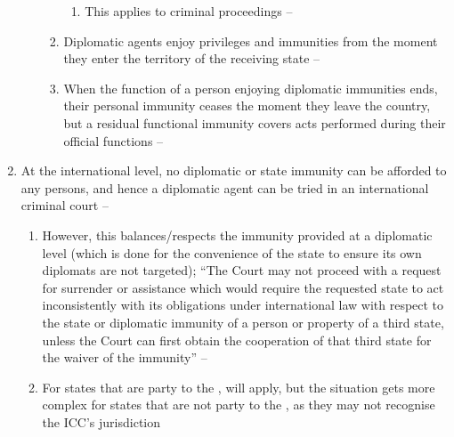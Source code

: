 \begin{enumerate}
\begin{enumerate}
\begin{enumerate}
\begin{enumerate}
                \item This applies to criminal proceedings -- 
            \end{enumerate}
            \item Diplomatic agents enjoy privileges and immunities from the moment they enter the territory of the receiving state -- 
            \item When the function of a person enjoying diplomatic immunities ends, their personal immunity ceases the moment they leave the country, but a residual functional immunity covers acts performed during their official functions -- 
        \end{enumerate}
    \end{enumerate}
    \item At the international level, no diplomatic or state immunity can be afforded to any persons, and hence a diplomatic agent can be tried in an international criminal court -- 
    \begin{enumerate}
        \item However, this balances/respects the immunity provided at a diplomatic level (which is done for the convenience of the state to ensure its own diplomats are not targeted); ``The Court may not proceed with a request for surrender or assistance which would require the requested state to act inconsistently with its obligations under international law with respect to the state or diplomatic immunity of a person or property of a third state, unless the Court can first obtain the cooperation of that third state for the waiver of the immunity'' -- 
        \item For states that are party to the ,  will apply, but the situation gets more complex for states that are not party to the , as they may not recognise the ICC's jurisdiction
    \end{enumerate}
\end{enumerate}


